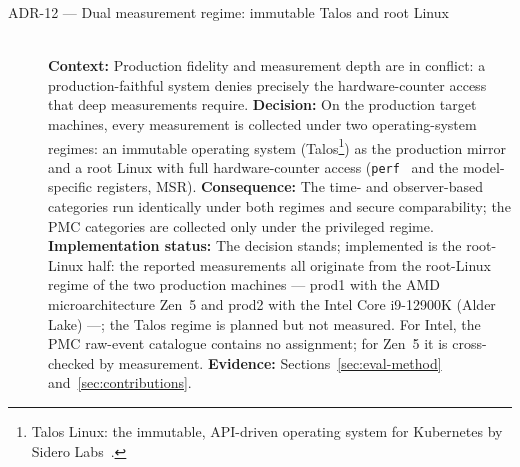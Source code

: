\begin{description}
  \item[ADR-12 --- Dual measurement regime: immutable Talos and root Linux]\hfill\\
  \textbf{Context:} Production fidelity and measurement depth are in conflict: a
  production-faithful system denies precisely the hardware-counter access that deep measurements
  require.
  \textbf{Decision:} On the production target machines, every measurement is collected under two
  operating-system regimes: an immutable operating system (Talos\footnote{Talos Linux: the
  immutable, API-driven operating system for Kubernetes by Sidero
  Labs~\cite{siderolabs_talos}.}) as the production mirror and a root Linux with full
  hardware-counter access (\texttt{perf}~\cite{demelo2010perf,linux_perf_event_open} and the
  model-specific registers, MSR).
  \textbf{Consequence:} The time- and observer-based categories run identically under both
  regimes and secure comparability; the PMC categories are collected only under the privileged
  regime.
  \textbf{Implementation status:} The decision stands; implemented is the root-Linux half: the
  reported measurements all originate from the root-Linux regime of the two production machines
  --- prod1 with the AMD microarchitecture Zen~5 and prod2 with the Intel Core i9-12900K (Alder
  Lake) ---; the Talos regime is planned but not measured. For Intel, the PMC raw-event catalogue
  contains no assignment; for Zen~5 it is cross-checked by measurement.
  \textbf{Evidence:} Sections~\ref{sec:eval-method} and~\ref{sec:contributions}.


\end{description}
